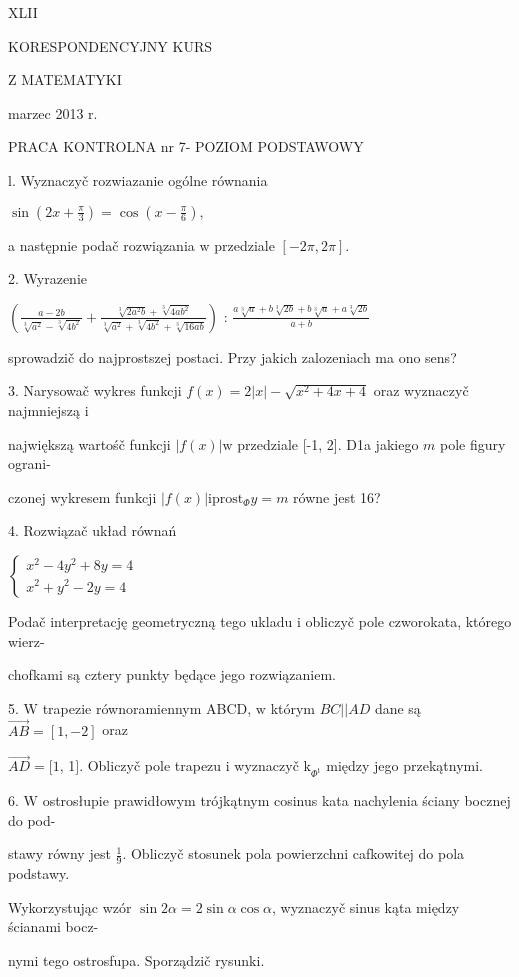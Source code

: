\documentclass[a4paper,12pt]{article}
\begin{document}
XLII

KORESPONDENCYJNY KURS

Z MATEMATYKI

marzec 2013 r.

PRACA KONTROLNA nr 7- POZIOM PODSTAWOWY

l. Wyznaczyč rozwiazanie ogólne równania

$\displaystyle \sin(2x+\frac{\pi}{3})=\cos(x-\frac{\pi}{6}),$

a następnie podač rozwiązania $\mathrm{w}$ przedziale $[-2\pi,2\pi].$

2. Wyrazenie

$(\displaystyle \frac{a-2b}{\sqrt[3]{a^{2}}-\sqrt[3]{4b^{2}}}+\frac{\sqrt[3]{2a^{2}b}+\sqrt[3]{4ab^{2}}}{\sqrt[3]{a^{2}}+\sqrt[3]{4b^{2}}+\sqrt[3]{16ab}})$ : $\displaystyle \frac{a\sqrt[3]{a}+b\sqrt[3]{2b}+b\sqrt[3]{a}+a\sqrt[3]{2b}}{a+b}$

sprowadzič do najprostszej postaci. Przy jakich zalozeniach ma ono sens?

3. Narysowač wykres funkcji $f(x) =2|x|-\sqrt{x^{2}+4x+4}$ oraz wyznaczyč najmniejszą $\mathrm{i}$

największą wartośč funkcji $|f(x)|\mathrm{w}$ przedziale [-1, 2]. D1a jakiego $m$ pole figury ograni-

czonej wykresem funkcji $|f(x)|\mathrm{i}\mathrm{p}\mathrm{r}\mathrm{o}\mathrm{s}\mathrm{t}_{\Phi}y=m$ równe jest 16?

4. Rozwiązač układ równań

$\left\{\begin{array}{l}
x^{2}-4y^{2}+8y=4\\
x^{2}+y^{2}-2y=4
\end{array}\right.$

Podač interpretację geometryczną tego ukladu $\mathrm{i}$ obliczyč pole czworokata, którego wierz-

chofkami są cztery punkty będące jego rozwiązaniem.

5. $\mathrm{W}$ trapezie równoramiennym ABCD, $\mathrm{w}$ którym $BC||AD$ dane są $\vec{AB} = [1,-2]$ oraz

$\vec{AD}=[1$, 1$]$. Obliczyč pole trapezu $\mathrm{i}$ wyznaczyč $\mathrm{k}_{\Phi^{\mathrm{t}}}$ między jego przekątnymi.

6. $\mathrm{W}$ ostrosłupie prawidłowym trójkątnym cosinus kata nachylenia ściany bocznej do pod-

stawy równy jest $\displaystyle \frac{1}{9}$. Obliczyč stosunek pola powierzchni cafkowitej do pola podstawy.

Wykorzystując wzór $\sin 2\alpha=2\sin\alpha\cos\alpha$, wyznaczyč sinus kąta między ścianami bocz-

nymi tego ostrosfupa. Sporządzič rysunki.
\end{document}

